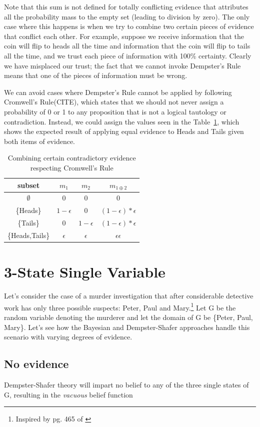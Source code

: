 \documentclass[letterpaper]{article}
\begin{document}
Note that this sum is not defined for totally conflicting evidence that attributes all the probability mass to the empty set (leading to division by zero).  The only case where this happens is when we try to combine two certain pieces of evidence that conflict each other.  For example, suppose we receive information that the coin will flip to heads all the time and information that the coin will flip to tails all the time, and we trust each piece of information with 100\% certainty.  Clearly we have misplaced our trust; the fact that we cannot invoke Dempster's Rule means that one of the pieces of information must be wrong.  

We can avoid cases where Dempster's Rule cannot be applied by following Cromwell's Rule(CITE), which states that we should not never assign a probability of 0 or 1 to any proposition that is not a logical tautology or contradiction.  Instead, we could assign the values seen in the Table~\ref{tab:CombineCoinCromwell}, which shows the expected result of applying equal evidence to Heads and Tails given both items of evidence.

\begin{table}[htbp]
\centering
\caption{Combining certain contradictory evidence respecting Cromwell's Rule}
\begin{tabular}{|c|c|c|c|}
\hline
subset & $m_1$ & $m_2$ & $m_{1 \oplus 2}$ \\
\hline
$\emptyset$ & 0 & 0 & 0 \\
\{Heads\} & $1-\epsilon$ & 0 & $(1-\epsilon)*\epsilon$ \\
\{Tails\} & 0 & $1-\epsilon$ & $(1-\epsilon)*\epsilon$ \\
\{Heads,Tails\} & $\epsilon$ & $\epsilon$ & $\epsilon\epsilon$ \\
\hline
\end{tabular}
\label{tab:CombineCoinCromwell}
\end{table}

\section{3-State Single Variable}
Let's consider the case of a murder investigation that after considerable detective work has only three possible suspects: Peter, Paul and Mary.\footnote{Inspired by pg. 465 of \cite{Pearl1988}}  Let G be the random variable denoting the murderer and let the domain of G be \{Peter, Paul, Mary\}.  Let's see how the Bayesian and Dempster-Shafer approaches handle this scenario with varying degrees of evidence. 

\subsection{No evidence}

Dempster-Shafer theory will impart no belief to any of the three single states of G, resulting in the \textit{vacuous} belief function




\end{document}
